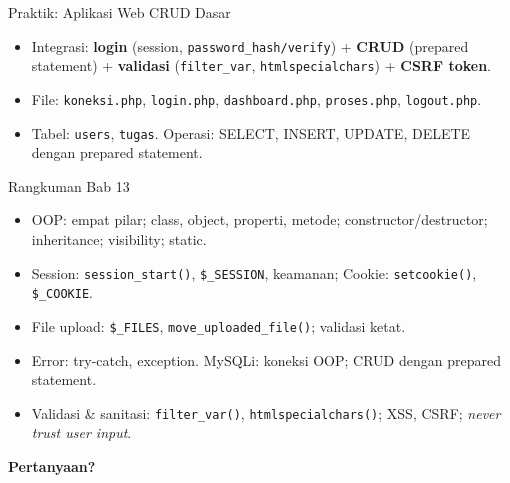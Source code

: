 \documentclass[handout]{beamer}
\begin{document}
\begin{frame}{Praktik: Aplikasi Web CRUD Dasar}
	\begin{itemize}
		\item Integrasi: \textbf{login} (session, \texttt{password\_hash/verify}) + \textbf{CRUD} (prepared statement) + \textbf{validasi} (\texttt{filter\_var}, \texttt{htmlspecialchars}) + \textbf{CSRF token}.
		\item File: \texttt{koneksi.php}, \texttt{login.php}, \texttt{dashboard.php}, \texttt{proses.php}, \texttt{logout.php}.
		\item Tabel: \texttt{users}, \texttt{tugas}. Operasi: SELECT, INSERT, UPDATE, DELETE dengan prepared statement.
	\end{itemize}
\end{frame}

\begin{frame}{Rangkuman Bab 13}
	\begin{itemize}
		\item OOP: empat pilar; class, object, properti, metode; constructor/destructor; inheritance; visibility; static.
		\item Session: \texttt{session\_start()}, \texttt{\$\_SESSION}, keamanan; Cookie: \texttt{setcookie()}, \texttt{\$\_COOKIE}.
		\item File upload: \texttt{\$\_FILES}, \texttt{move\_uploaded\_file()}; validasi ketat.
		\item Error: try-catch, exception. MySQLi: koneksi OOP; CRUD dengan prepared statement.
		\item Validasi \& sanitasi: \texttt{filter\_var()}, \texttt{htmlspecialchars()}; XSS, CSRF; \textit{never trust user input}.
	\end{itemize}
\end{frame}

\begin{frame}{}
	\centering
	\vfill
	\textbf{\Large Pertanyaan?}
	\vfill
\end{frame}
\end{document}
